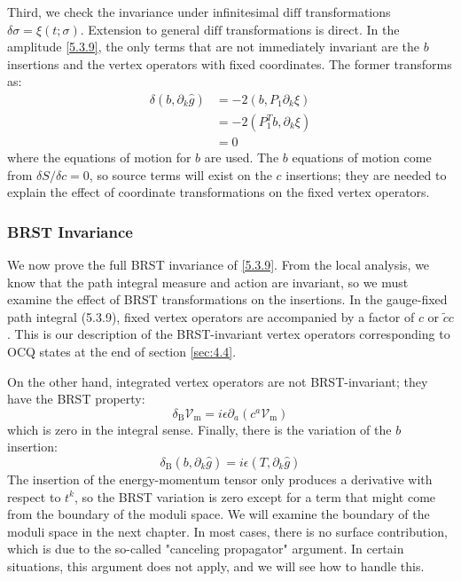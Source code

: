 Third, we check the invariance under infinitesimal $\text{diff}$ transformations $\delta \sigma = \xi(t; \sigma)$. Extension to general $\text{diff}$ transformations is direct. In the amplitude \eqref{5.3.9}, the only terms that are not immediately invariant are the $b$ insertions and the vertex operators with fixed coordinates. The former transforms as:
\begin{equation}
	\begin{aligned}
		\delta\left(b, \partial_{k} \hat{g}\right) &=-2\left(b, P_{1} \partial_{k} \xi\right) \\
		&=-2\left(P_{1}^{T} b, \partial_{k} \xi\right) \\
		&=0
	\end{aligned}
\end{equation}
where the equations of motion for $b$ are used. The $b$ equations of motion come from $\delta S / \delta c = 0$, so source terms will exist on the $c$ insertions; they are needed to explain the effect of coordinate transformations on the fixed vertex operators.

\subsubsection*{\Large BRST Invariance}
We now prove the full BRST invariance of \eqref{5.3.9}. From the local analysis, we know that the path integral measure and action are invariant, so we must examine the effect of BRST transformations on the insertions. In the gauge-fixed path integral (5.3.9), fixed vertex operators are accompanied by a factor of $c$ or $\tilde{c} c$. This is our description of the BRST-invariant vertex operators corresponding to OCQ states at the end of section \ref{sec:4.4}.

On the other hand, integrated vertex operators are not BRST-invariant; they have the BRST property:
\begin{equation}
	\delta_{\mathrm{B}} \mathscr{V}_{\mathrm{m}}=i \epsilon \partial_{a}\left(c^{a} \mathscr{V}_{\mathrm{m}}\right)
\end{equation}
which is zero in the integral sense. Finally, there is the variation of the $b$ insertion:
\begin{equation}
	\delta_{\mathrm{B}}\left(b, \partial_{k} \hat{g}\right)=i \epsilon\left(T, \partial_{k} \hat{g}\right)
\end{equation}
The insertion of the energy-momentum tensor only produces a derivative with respect to $t^{k}$, so the BRST variation is zero except for a term that might come from the boundary of the moduli space. We will examine the boundary of the moduli space in the next chapter. In most cases, there is no surface contribution, which is due to the so-called "canceling propagator" argument. In certain situations, this argument does not apply, and we will see how to handle this.

